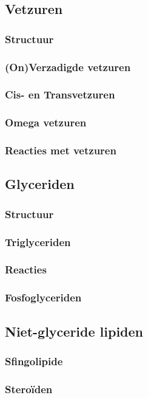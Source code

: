 \documentclass[a4paper,kul]{kulakarticle} %
\begin{document}
\subsection{Vetzuren}
\subsubsection{Structuur}
\subsubsection{(On)Verzadigde vetzuren}
\subsubsection{Cis- en Transvetzuren}
\subsubsection{Omega vetzuren}
\subsubsection{Reacties met vetzuren}
\subsection{Glyceriden}
\subsubsection{Structuur}
\subsubsection{Triglyceriden}
\subsubsection{Reacties}
\subsubsection{Fosfoglyceriden}
\subsection{Niet-glyceride lipiden}
\subsubsection{Sfingolipide}
\subsubsection{Steroïden}
\end{document}
